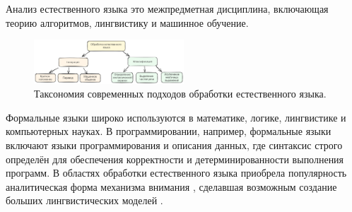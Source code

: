 Анализ естественного языка это межпредметная дисциплина, включающая теорию алгоритмов, 
лингвистику и машинное обучение.

\begin{figure}[h]
    \centering
    \includegraphics[width=0.5\textwidth]{assets/ml/nlp/taxonomy.excalidraw.png}
    \caption{Таксономия современных подходов обработки естественного языка.}
    \label{llm_taxonomy}
\end{figure}

Формальные языки широко используются в математике, логике, лингвистике и компьютерных науках. 
В программировании, например, формальные языки включают языки программирования и описания данных, 
где синтаксис строго определён для обеспечения корректности и детерминированности выполнения программ.
В областях обработки естественного языка приобрела популярность аналитическая форма механизма внимания \cite{vaswani2017attention},
сделавшая возможным создание больших лингвистических моделей \cite{radford2019language}.

